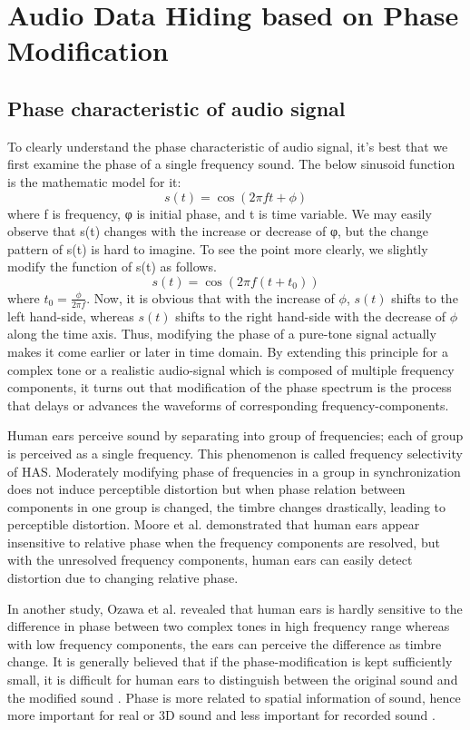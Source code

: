 \section{Audio Data Hiding based on Phase Modification}
\subsection{Phase characteristic of audio signal}
To clearly understand the phase characteristic of audio signal, it's best that we first examine the phase of a single frequency sound. The below sinusoid function is the mathematic model for it:
\[s(t)=\cos{(2\pi ft+\phi)}\]
where f is frequency, φ is initial phase, and t is time variable. We may easily observe that
s(t) changes with the increase or decrease of φ, but the change pattern of s(t) is hard to
imagine. To see the point more clearly, we slightly modify the function of s(t) as follows.
\[s(t) = \cos(2\pi f (t + t_0))\]
where \(t_0=\frac{\phi}{2\pi f}\). Now, it is obvious that with the increase of $\phi$, $s(t)$ shifts to the left hand-side, whereas $s(t)$ shifts to the right hand-side with the decrease of $\phi$ along the time axis. Thus, modifying the phase of a pure-tone signal actually makes it come earlier or later in time domain. By extending this principle for a complex tone or a realistic audio-signal which is composed of multiple frequency components, 
it turns out that modification of the phase spectrum is the process that delays or advances the waveforms of corresponding frequency-components. 

Human ears perceive sound by separating into group of frequencies; each of group
is perceived as a single frequency. This phenomenon is called frequency selectivity of
HAS. Moderately modifying phase of frequencies in a group in synchronization does not
induce perceptible distortion but when phase relation between components in one group is
changed, the timbre changes drastically, leading to perceptible distortion. Moore et al. \cite{moore}
demonstrated that human ears appear insensitive to relative phase when the frequency
components are resolved, but with the unresolved frequency components, human ears can
easily detect distortion due to changing relative phase.

In another study, Ozawa et al. \cite{ozawa} revealed that human ears is hardly sensitive to
the difference in phase between two complex tones in high frequency range whereas with
low frequency components, the ears can perceive the difference as timbre change. It is
generally believed that if the phase-modification is kept sufficiently small, it is difficult
for human ears to distinguish between the original sound and the modified sound \cite{aiba}.
Phase is more related to spatial information of sound, hence more important for real or
3D sound and less important for recorded sound \cite{yasi}\cite{yost}.

